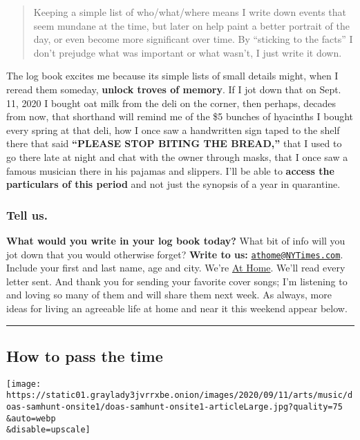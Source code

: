\begin{quote}
Keeping a simple list of who/what/where means I write down events that
seem mundane at the time, but later on help paint a better portrait of
the day, or even become more significant over time. By ``sticking to the
facts'' I don't prejudge what was important or what wasn't, I just write
it down.
\end{quote}

The log book excites me because its simple lists of small details might,
when I reread them someday, \textbf{unlock troves of memory}. If I jot
down that on Sept. 11, 2020 I bought oat milk from the deli on the
corner, then perhaps, decades from now, that shorthand will remind me of
the \$5 bunches of hyacinths I bought every spring at that deli, how I
once saw a handwritten sign taped to the shelf there that said
\textbf{``PLEASE STOP BITING THE BREAD,''} that I used to go there late
at night and chat with the owner through masks, that I once saw a famous
musician there in his pajamas and slippers. I'll be able to
\textbf{access the particulars of this period} and not just the synopsis
of a year in quarantine.

\hypertarget{tell-us}{%
\subsubsection{Tell us.}\label{tell-us}}

\textbf{What would you write in your log book today?} What bit of info
will you jot down that you would otherwise forget? \textbf{Write to us:}
\href{mailto:athome@NYTimes.com}{\nolinkurl{athome@NYTimes.com}}.
Include your first and last name, age and city. We're
\href{https://www.nytimes3xbfgragh.onion/spotlight/at-home}{At Home}.
We'll read every letter sent. And thank you for sending your favorite
cover songs; I'm listening to and loving so many of them and will share
them next week. As always, more ideas for living an agreeable life at
home and near it this weekend appear below.

\begin{center}\rule{0.5\linewidth}{\linethickness}\end{center}

\hypertarget{how-to-pass-the-time}{%
\subsection{How to pass the time}\label{how-to-pass-the-time}}

\texttt{[image: https://static01.graylady3jvrrxbe.onion/images/2020/09/11/arts/music/doas-samhunt-onsite1/doas-samhunt-onsite1-articleLarge.jpg?quality=75\\\&auto=webp\\\&disable=upscale]}

